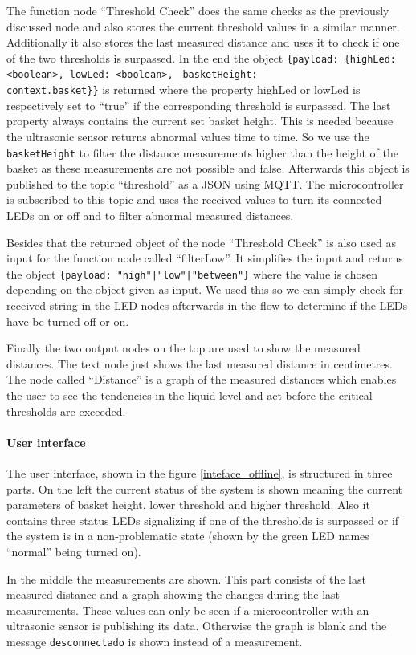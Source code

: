 \documentclass{article}
\begin{document}
The function node \enquote{Threshold Check} does the same checks as the previously discussed node and also stores the current threshold values in a similar manner.  Additionally it also stores the last measured distance and uses it to check if one of the two thresholds is surpassed. In the end the object \verb|{payload: {highLed: <boolean>, lowLed: <boolean>,| \verb| basketHeight:| \\
\verb|context.basket}}| is returned where the property 
highLed or lowLed is respectively set to \enquote{true} if the corresponding
threshold is surpassed. The last property always contains the current set
basket height. This is needed because the ultrasonic sensor returns abnormal values time to time. So we use the \verb|basketHeight| to filter the distance measurements higher than the height of the basket as these measurements are not possible and false. Afterwards this object is published to the topic
\enquote{threshold} as a JSON using MQTT. The microcontroller is subscribed to
this topic and uses the received values to turn its connected LEDs on or off and
to filter abnormal measured distances.\par
Besides that the returned object of the node \enquote{Threshold Check} is also
used as input for the function node called \enquote{filterLow}. It simplifies
the input and returns the object \texttt{\{payload: "high"|"low"|"between"\}}
where the value is chosen depending on the object given as input. We used this
so we can simply check for received string in the LED nodes afterwards in the
flow to determine if the LEDs have be turned off or on.\par
Finally the two output nodes on the top are used to show the measured
distances. The text node just shows the last measured distance in centimetres.
The node called \enquote{Distance} is a graph of the measured distances which
enables the user to see the tendencies in the liquid level and act before
the critical thresholds are exceeded.

\paragraph{User interface}\mbox{}
The user interface, shown in the figure \ref{inteface_offline}, is structured in three parts. On
the left the current status of the system is shown meaning the current
parameters of basket height, lower threshold and higher threshold. Also it contains three
status LEDs signalizing if one of the thresholds is surpassed or if the system
is in a non-problematic state (shown by the green LED names \enquote{normal}
being turned on).\par
In the middle the measurements are shown. This part consists of the last measured
distance and a graph showing the changes during the last measurements. These
values can only be seen if a microcontroller with an ultrasonic sensor is
publishing its data. Otherwise the graph is blank and the message
\verb|desconnectado| is shown instead of a measurement.
\end{document}
